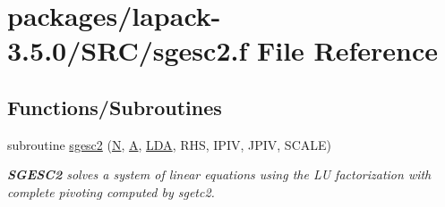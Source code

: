 \hypertarget{sgesc2_8f}{}\section{packages/lapack-\/3.5.0/\+S\+R\+C/sgesc2.f File Reference}
\label{sgesc2_8f}
\subsection*{Functions/\+Subroutines}
\begin{DoxyCompactItemize}
\item 
subroutine \hyperlink{group__realGEauxiliary_ga8ad3f90608eb3f7cc3ea700ea36b8fdc}{sgesc2} (\hyperlink{polmisc_8c_a0240ac851181b84ac374872dc5434ee4}{N}, \hyperlink{classA}{A}, \hyperlink{example__user_8c_ae946da542ce0db94dced19b2ecefd1aa}{L\+D\+A}, R\+H\+S, I\+P\+I\+V, J\+P\+I\+V, S\+C\+A\+L\+E)
\begin{DoxyCompactList}\small\item\em {\bfseries S\+G\+E\+S\+C2} solves a system of linear equations using the L\+U factorization with complete pivoting computed by sgetc2. \end{DoxyCompactList}\end{DoxyCompactItemize}
